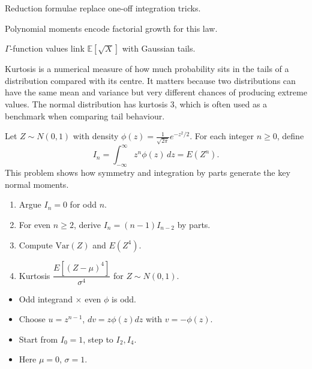 \begin{takeaways}
\item Reduction formulae replace one-off integration tricks.
\item Polynomial moments encode factorial growth for this law.
\item $\Gamma$-function values link $\mathbb{E}[\sqrt{X}]$ with Gaussian tails.
\end{takeaways}

\begin{problem}
Kurtosis is a numerical measure of how much probability sits in the tails of a distribution compared with its centre. It matters because two distributions can have the same mean and variance but very different chances of producing extreme values. The normal distribution has kurtosis $3$, which is often used as a benchmark when comparing tail behaviour.

Let $Z\sim N(0,1)$ with density $\phi(z)=\frac{1}{\sqrt{2\pi}}e^{-z^{2}/2}$. For each integer $n\ge0$, define
\[
I_n=\int_{-\infty}^{\infty}z^n\phi(z)\,dz=E(Z^n).
\]
This problem shows how symmetry and integration by parts generate the key normal moments.
\begin{enumerate}[label=\textbf{(\roman*)}]
  \item Argue $I_{n}=0$ for odd $n$.
  \item For even $n\ge 2$, derive $I_{n}=(n-1)I_{n-2}$ by parts.
  \item Compute $\mathrm{Var}(Z)$ and $E(Z^{4})$.
  \item Kurtosis $\dfrac{E[(Z-\mu)^{4}]}{\sigma^{4}}$ for $Z\sim N(0,1)$.
\end{enumerate}
\end{problem}

\begin{hint}
\begin{itemize}[leftmargin=*]
  \item Odd integrand $\times$ even $\phi$ is odd.
  \item Choose $u=z^{n-1}$, $dv=z\phi(z)dz$ with $v=-\phi(z)$.
  \item Start from $I_{0}=1$, step to $I_{2},I_{4}$.
  \item Here $\mu=0$, $\sigma=1$.
\end{itemize}
\end{hint}

